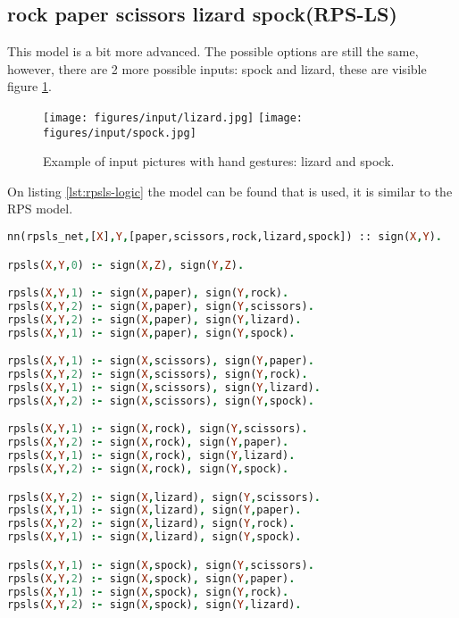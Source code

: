 \subsection{rock paper scissors lizard spock(RPS-LS)}

This model is a bit more advanced. The possible options are still the same, however, there are 2 more possible inputs: spock and lizard, these are visible figure \ref{fig:rpsls_input}. 

\begin{figure}[htp]
    \centering
    \texttt{[image: figures/input/lizard.jpg]}
    \texttt{[image: figures/input/spock.jpg]}
    \caption{Example of input pictures with hand gestures: lizard and spock\cite{RPSLS-database}.} %
    \label{fig:rpsls_input}
\end{figure}

On listing \ref{lst:rpsls-logic} the model can be found that is used, it is similar to the RPS model.

\begin{lstlisting}[label={lst:rpsls-logic},language=Prolog,frame=single,caption={Rock paper scissors lizard spock DeepProbLog model},captionpos=b]
nn(rpsls_net,[X],Y,[paper,scissors,rock,lizard,spock]) :: sign(X,Y).

rpsls(X,Y,0) :- sign(X,Z), sign(Y,Z).

rpsls(X,Y,1) :- sign(X,paper), sign(Y,rock).
rpsls(X,Y,2) :- sign(X,paper), sign(Y,scissors).
rpsls(X,Y,2) :- sign(X,paper), sign(Y,lizard).
rpsls(X,Y,1) :- sign(X,paper), sign(Y,spock).

rpsls(X,Y,1) :- sign(X,scissors), sign(Y,paper).
rpsls(X,Y,2) :- sign(X,scissors), sign(Y,rock).
rpsls(X,Y,1) :- sign(X,scissors), sign(Y,lizard).
rpsls(X,Y,2) :- sign(X,scissors), sign(Y,spock).

rpsls(X,Y,1) :- sign(X,rock), sign(Y,scissors).
rpsls(X,Y,2) :- sign(X,rock), sign(Y,paper).
rpsls(X,Y,1) :- sign(X,rock), sign(Y,lizard).
rpsls(X,Y,2) :- sign(X,rock), sign(Y,spock).

rpsls(X,Y,2) :- sign(X,lizard), sign(Y,scissors).
rpsls(X,Y,1) :- sign(X,lizard), sign(Y,paper).
rpsls(X,Y,2) :- sign(X,lizard), sign(Y,rock).
rpsls(X,Y,1) :- sign(X,lizard), sign(Y,spock).

rpsls(X,Y,1) :- sign(X,spock), sign(Y,scissors).
rpsls(X,Y,2) :- sign(X,spock), sign(Y,paper).
rpsls(X,Y,1) :- sign(X,spock), sign(Y,rock).
rpsls(X,Y,2) :- sign(X,spock), sign(Y,lizard).
    \end{lstlisting}


